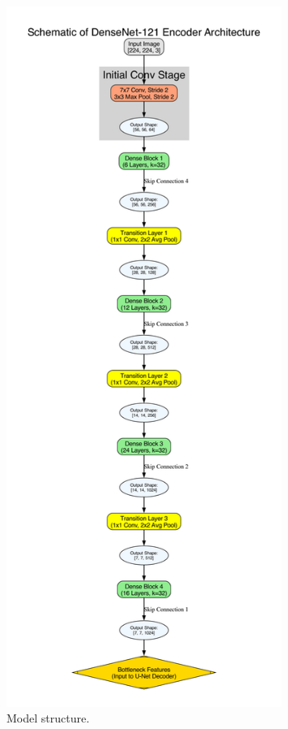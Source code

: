 \documentclass[../main.tex]{subfiles}
\begin{document}
\begin{figure}[h!] %
    \centering %
    \includegraphics[width=0.8\textwidth]{densenet121_structure.pdf} %
    \caption{Model structure.} %
    \label{fig:my_pdf_graph} %
\end{figure}
\end{document}
